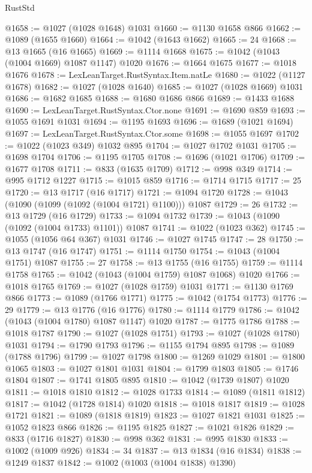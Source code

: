 \begin{lexlean}{RustStd}
\begin{coremodule}
@1658 := @1027 (@1028 @1648) @1031
@1660 := @1130 @1658 @866
@1662 := @1089 (@1655 @1660)
@1664 := @1042 (@1643 @1662)
@1665 := 24
@1668 := @13 @1665 (@16 @1665)
@1669 := @1114 @1668
@1675 := @1042 (@1043 (@1004 @1669) @1087 @1147) @1020
@1676 := @1664 @1675
@1677 := @1018 @1676
@1678 := LexLeanTarget.RustSyntax.Item.natLe
@1680 := @1022 (@1127 @1678)
@1682 := @1027 (@1028 @1640)
@1685 := @1027 (@1028 @1669) @1031
@1686 := @1682 @1685
@1688 := @1680 @1686 @866
@1689 := @1433 @1688
@1690 := LexLeanTarget.RustSyntax.Ctor.none
@1691 := @1690 @859
@1693 := @1055 @1691 @1031
@1694 := @1195 @1693
@1696 := @1689 (@1021 @1694)
@1697 := LexLeanTarget.RustSyntax.Ctor.some
@1698 := @1055 @1697
@1702 := @1022 (@1023 @349) @1032 @895
@1704 := @1027 @1702 @1031
@1705 := @1698 @1704
@1706 := @1195 @1705
@1708 := @1696 (@1021 @1706)
@1709 := @1677 @1708
@1711 := @833 (@1635 @1709)
@1712 := @998 @349
@1714 := @995 @1712 @1227
@1715 := @1015 @859
@1716 := @1714 @1715
@1717 := 25
@1720 := @13 @1717 (@16 @1717)
@1721 := @1094 @1720
@1728 := @1043 (@1090 (@1099 (@1092 (@1004 @1721) @1100))) @1087
@1729 := 26
@1732 := @13 @1729 (@16 @1729)
@1733 := @1094 @1732
@1739 := @1043 (@1090 (@1092 (@1004 @1733) @1101)) @1087
@1741 := @1022 (@1023 @362)
@1745 := @1055 (@1056 @64 @367) @1031
@1746 := @1027 @1745
@1747 := 28
@1750 := @13 @1747 (@16 @1747)
@1751 := @1114 @1750
@1754 := @1043 (@1004 @1751) @1087
@1755 := 27
@1758 := @13 @1755 (@16 @1755)
@1759 := @1114 @1758
@1765 := @1042 (@1043 (@1004 @1759) @1087 @1068) @1020
@1766 := @1018 @1765
@1769 := @1027 (@1028 @1759) @1031
@1771 := @1130 @1769 @866
@1773 := @1089 (@1766 @1771)
@1775 := @1042 (@1754 @1773)
@1776 := 29
@1779 := @13 @1776 (@16 @1776)
@1780 := @1114 @1779
@1786 := @1042 (@1043 (@1004 @1780) @1087 @1147) @1020
@1787 := @1775 @1786
@1788 := @1018 @1787
@1790 := @1027 (@1028 @1751)
@1793 := @1027 (@1028 @1780) @1031
@1794 := @1790 @1793
@1796 := @1155 @1794 @895
@1798 := @1089 (@1788 @1796)
@1799 := @1027 @1798
@1800 := @1269 @1029
@1801 := @1800 @1065
@1803 := @1027 @1801 @1031
@1804 := @1799 @1803
@1805 := @1746 @1804
@1807 := @1741 @1805 @895
@1810 := @1042 (@1739 @1807) @1020
@1811 := @1018 @1810
@1812 := @1028 @1733
@1814 := @1089 (@1811 @1812)
@1817 := @1042 (@1728 @1814) @1020
@1818 := @1018 @1817
@1819 := @1028 @1721
@1821 := @1089 (@1818 @1819)
@1823 := @1027 @1821 @1031
@1825 := @1052 @1823 @866
@1826 := @1195 @1825
@1827 := @1021 @1826
@1829 := @833 (@1716 @1827)
@1830 := @998 @362
@1831 := @995 @1830
@1833 := @1002 (@1009 @926)
@1834 := 34
@1837 := @13 @1834 (@16 @1834)
@1838 := @1249 @1837
@1842 := @1002 (@1003 (@1004 @1838) @1390)

\end{coremodule}
\end{lexlean}
